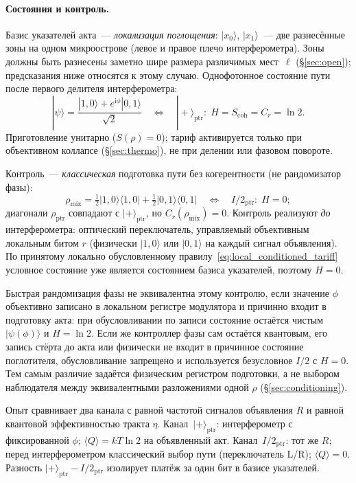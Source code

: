 \documentclass[11pt,a4paper]{article}
\newcommand{\Sref}[1]{\hyperref[#1]{\S\ref{#1}}}
\begin{document}
\paragraph{Состояния и контроль.}
Базис указателей акта~--- \emph{локализация поглощения}: $|x_0\rangle$, $|x_1\rangle$~--- две разнесённые зоны на одном микроострове (левое и правое плечо интерферометра). Зоны должны быть разнесены заметно шире размера различимых мест~$\ell$ (\Sref{sec:open}); предсказания ниже относятся к этому случаю. Однофотонное состояние пути после первого делителя интерферометра:
\begin{equation}
|\psi\rangle = \frac{|1,0\rangle + e^{\mathrm{i}\phi}|0,1\rangle}{\sqrt{2}}
\quad\Leftrightarrow\quad
|{+}\rangle_{\mathrm{ptr}}:\;
H = S_{\mathrm{coh}} = C_r = \ln 2.
\end{equation}
Приготовление унитарно ($S(\rho)=0$); тариф активируется только при объективном коллапсе (\Sref{sec:thermo}), не при делении или фазовом повороте.

Контроль~--- \emph{классическая} подготовка пути без когерентности (не рандомизатор фазы):
\begin{equation}
\rho_{\mathrm{mix}} = \tfrac{1}{2}|1,0\rangle\langle 1,0| + \tfrac{1}{2}|0,1\rangle\langle 0,1|
\quad\Leftrightarrow\quad
I/2_{\mathrm{ptr}}:\;
H = 0;
\end{equation}
диагонали $\rho_{\mathrm{ptr}}$ совпадают с $|{+}\rangle_{\mathrm{ptr}}$, но $C_r(\rho_{\mathrm{mix}})=0$. Контроль реализуют \emph{до} интерферометра: оптический переключатель, управляемый объективным локальным битом $r$ (физически $|1,0\rangle$ или $|0,1\rangle$ на каждый сигнал объявления). По принятому локально обусловленному правилу~\eqref{eq:local_conditioned_tariff} условное состояние уже является состоянием базиса указателей, поэтому $H=0$.

Быстрая рандомизация фазы не эквивалентна этому контролю, если значение $\phi$ объективно записано в локальном регистре модулятора и причинно входит в подготовку акта: при обусловливании по записи состояние остаётся чистым $|\psi(\phi)\rangle$ и $H=\ln2$. Если же контроллер фазы сам остаётся квантовым, его запись стёрта до акта или физически не входит в причинное состояние поглотителя, обусловливание запрещено и используется безусловное $I/2$ с $H=0$. Тем самым различие задаётся физическим регистром подготовки, а не выбором наблюдателя между эквивалентными разложениями одной $\rho$ (\Sref{sec:conditioning}).

Опыт сравнивает два канала с равной частотой сигналов объявления $R$ и равной квантовой эффективностью тракта $\eta$. Канал~$|{+}\rangle_{\mathrm{ptr}}$: интерферометр с фиксированной $\phi$; $\langle Q\rangle = kT\ln 2$ на объявленный акт. Канал~$I/2_{\mathrm{ptr}}$: тот же $R$; перед интерферометром классический выбор пути (переключатель L/R); $\langle Q\rangle = 0$. Разность $|{+}\rangle_{\mathrm{ptr}} - I/2_{\mathrm{ptr}}$ изолирует платёж за один бит в базисе указателей.
\end{document}
